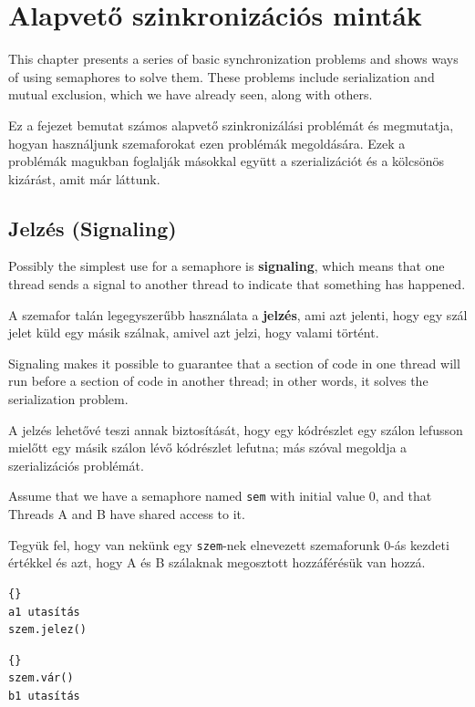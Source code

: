 \documentclass{book}
\newcommand{\clearemptydoublepage}{\newpage\cleardoublepage}
\begin{document}
\clearemptydoublepage
\chapter{Alapvető szinkronizációs minták}

This chapter presents a series of basic synchronization problems and
shows ways of using semaphores to solve them.  These problems include
serialization and mutual exclusion, which we have already seen, along
with others.

Ez a fejezet bemutat számos alapvető szinkronizálási problémát és megmutatja,
hogyan használjunk szemaforokat ezen problémák megoldására. Ezek a problémák
magukban foglalják másokkal együtt a szerializációt és a kölcsönös kizárást, amit már
láttunk.

\section{Jelzés (Signaling)}

Possibly the simplest use for a semaphore is {\bf signaling},
which means that one thread sends a signal to another
thread to indicate that something has happened.

A szemafor talán legegyszerűbb használata a {\bf jelzés}, ami azt
jelenti, hogy egy szál jelet küld egy másik szálnak, amivel azt
jelzi, hogy valami történt.

Signaling makes it possible to guarantee
that a section of code in one thread will run before a section of
code in another thread; in other words, it solves the serialization
problem.

A jelzés lehetővé teszi annak biztosítását, hogy egy kódrészlet egy
szálon lefusson mielőtt egy másik szálon lévő kódrészlet lefutna;
más szóval megoldja a szerializációs problémát.

Assume that we have a semaphore named {\tt sem} with initial value
0, and that Threads A and B have shared access to it.

Tegyük fel, hogy van nekünk egy {\tt szem}-nek elnevezett szemaforunk
0-ás kezdeti értékkel és azt, hogy A és B szálaknak megosztott
hozzáférésük van hozzá.


\begin{minipage}[t]{2in}
\begin{lstlisting}[title={„A” szál}]{}
a1 utasítás
szem.jelez()
\end{lstlisting}
\end{minipage}
\hfill
\begin{minipage}[t]{2in}
\begin{lstlisting}[title={„B” szál}]{}
szem.vár()
b1 utasítás
\end{lstlisting}
\end{minipage}
\end{document}
